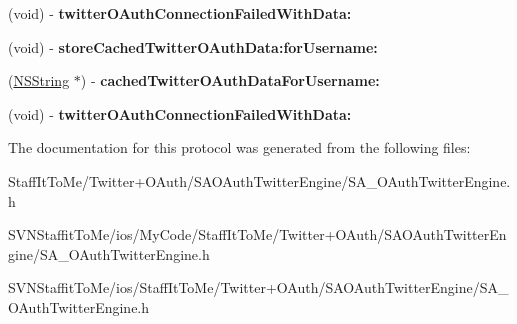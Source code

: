 \begin{DoxyCompactItemize}
\item 
\hypertarget{protocol_s_a___o_auth_twitter_engine_delegate-p_abf2ca64b17b5440343167a3d6faa0542}{
(void) -\/ {\bfseries twitter\-O\-Auth\-Connection\-Failed\-With\-Data\-:}}
\label{protocol_s_a___o_auth_twitter_engine_delegate-p_abf2ca64b17b5440343167a3d6faa0542}

\item 
\hypertarget{protocol_s_a___o_auth_twitter_engine_delegate-p_ad5334f98671ef61d2588767ed1d4e0b9}{
(void) -\/ {\bfseries store\-Cached\-Twitter\-O\-Auth\-Data\-:for\-Username\-:}}
\label{protocol_s_a___o_auth_twitter_engine_delegate-p_ad5334f98671ef61d2588767ed1d4e0b9}

\item 
\hypertarget{protocol_s_a___o_auth_twitter_engine_delegate-p_a9f0f5316b6bcd5630b6d4e0c4b9347fa}{
(\hyperlink{class_n_s_string}{\-N\-S\-String} $\ast$) -\/ {\bfseries cached\-Twitter\-O\-Auth\-Data\-For\-Username\-:}}
\label{protocol_s_a___o_auth_twitter_engine_delegate-p_a9f0f5316b6bcd5630b6d4e0c4b9347fa}

\item 
\hypertarget{protocol_s_a___o_auth_twitter_engine_delegate-p_abf2ca64b17b5440343167a3d6faa0542}{
(void) -\/ {\bfseries twitter\-O\-Auth\-Connection\-Failed\-With\-Data\-:}}
\label{protocol_s_a___o_auth_twitter_engine_delegate-p_abf2ca64b17b5440343167a3d6faa0542}

\end{DoxyCompactItemize}


\-The documentation for this protocol was generated from the following files\-:\begin{DoxyCompactItemize}
\item 
\-Staff\-It\-To\-Me/\-Twitter+\-O\-Auth/\-S\-A\-O\-Auth\-Twitter\-Engine/\-S\-A\-\_\-\-O\-Auth\-Twitter\-Engine.\-h\item 
\-S\-V\-N\-Staffit\-To\-Me/ios/\-My\-Code/\-Staff\-It\-To\-Me/\-Twitter+\-O\-Auth/\-S\-A\-O\-Auth\-Twitter\-Engine/\-S\-A\-\_\-\-O\-Auth\-Twitter\-Engine.\-h\item 
\-S\-V\-N\-Staffit\-To\-Me/ios/\-Staff\-It\-To\-Me/\-Twitter+\-O\-Auth/\-S\-A\-O\-Auth\-Twitter\-Engine/\-S\-A\-\_\-\-O\-Auth\-Twitter\-Engine.\-h\end{DoxyCompactItemize}
